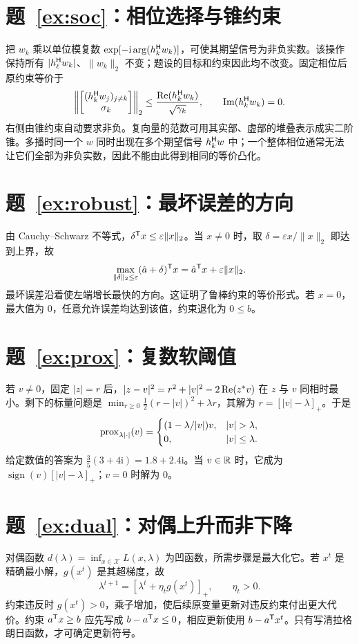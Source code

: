 \section*{题~\ref{ex:soc}：相位选择与锥约束}
把 $w_k$ 乘以单位模复数 $\exp[-\mathrm i\arg(h_k^{\mathsf H}w_k)]$，可使其期望信号为非负实数。该操作保持所有 $|h_\ell^{\mathsf H}w_k|$、$\|w_k\|_2$ 不变；题设的目标和约束因此均不改变。固定相位后原约束等价于
\[
 \left\|\begin{bmatrix}(h_k^{\mathsf H}w_j)_{j\ne k}\\\sigma_k\end{bmatrix}\right\|_2
 \leq\frac{\operatorname{Re}(h_k^{\mathsf H}w_k)}{\sqrt{\gamma_k}},
 \qquad \operatorname{Im}(h_k^{\mathsf H}w_k)=0.
\]
右侧由锥约束自动要求非负。复向量的范数可用其实部、虚部的堆叠表示成实二阶锥。多播时同一个 $w$ 同时出现在多个期望信号 $h_k^{\mathsf H}w$ 中；一个整体相位通常无法让它们全部为非负实数，因此不能由此得到相同的等价凸化。

\section*{题~\ref{ex:robust}：最坏误差的方向}
由 Cauchy--Schwarz 不等式，$\delta^{\mathsf T}x\leq\varepsilon\|x\|_2$。当 $x\ne0$ 时，取 $\delta=\varepsilon x/\|x\|_2$ 即达到上界，故
\[
 \max_{\|\delta\|_2\leq\varepsilon}(\hat a+\delta)^{\mathsf T}x
 =\hat a^{\mathsf T}x+\varepsilon\|x\|_2.
\]
最坏误差沿着使左端增长最快的方向。这证明了鲁棒约束的等价形式。若 $x=0$，最大值为 $0$，任意允许误差均达到该值，约束退化为 $0\leq b$。

\section*{题~\ref{ex:prox}：复数软阈值}
若 $v\ne0$，固定 $|z|=r$ 后，$|z-v|^2=r^2+|v|^2-2\operatorname{Re}(z^*v)$ 在 $z$ 与 $v$ 同相时最小。剩下的标量问题是
$\min_{r\geq0}\frac12(r-|v|)^2+\lambda r$，其解为 $r=[|v|-\lambda]_+$。于是
\[
 \prox_{\lambda|\cdot|}(v)=
 \begin{cases}
 (1-\lambda/|v|)v,&|v|>\lambda,\\
 0,&|v|\leq\lambda.
 \end{cases}
\]
给定数值的答案为 $\frac35(3+4\mathrm i)=1.8+2.4\mathrm i$。当 $v\in\mathbb R$ 时，它成为 $\operatorname{sign}(v)[|v|-\lambda]_+$；$v=0$ 时解为 $0$。

\section*{题~\ref{ex:dual}：对偶上升而非下降}
对偶函数 $d(\lambda)=\inf_{x\in\mathcal X}L(x,\lambda)$ 为凹函数，所需步骤是最大化它。若 $x^t$ 是精确最小解，$g(x^t)$ 是其超梯度，故
\[
 \lambda^{t+1}=[\lambda^t+\eta_t g(x^t)]_+,
 \qquad\eta_t>0.
\]
约束违反时 $g(x^t)>0$，乘子增加，使后续原变量更新对违反约束付出更大代价。约束 $a^{\mathsf T}x\geq b$ 应先写成 $b-a^{\mathsf T}x\leq0$，相应更新使用 $b-a^{\mathsf T}x^t$。只有写清拉格朗日函数，才可确定更新符号。

